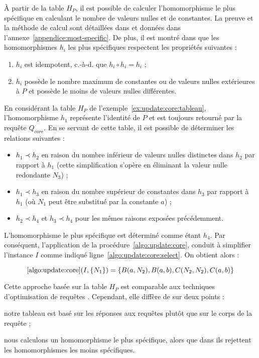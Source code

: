 À partir de la table $H_P$, il est possible de calculer l'homomorphisme le plus spécifique en calculant le nombre de valeurs nulles et de constantes.
La preuve et la méthode de calcul sont détaillées dans \cite{chabinIncrementalConsistentUpdating2023} et données dans l'annexe~\ref{appendice:most-specific}.
De plus, il est montré dans \cite{chabinIncrementalConsistentUpdating2023} que les homomorphismes $h_i$ les plus spécifiques respectent les propriétés suivantes :

\begin{enumerate}
	\item $h_i$ est idempotent, c.-à-d. que $h_i \circ h_i = h_i$ ;
	\item $h_i$ possède le nombre maximum de constantes ou de valeurs nulles extérieures à $P$ et possède le moins de valeurs nulles différentes.
\end{enumerate}

\begin{example}
	En considérant la table $H_P$ de l'exemple~\ref{ex:update:core:tableau}, l'homomorphisme $h_1$ représente l'identité de $P$ et est toujours retourné par la requête $Q_{core}$.
	En se servant de cette table, il est possible de déterminer les relations suivantes :

	\begin{itemize}
		\item $h_1 \prec h_2$ en raison du nombre inférieur de valeurs nulles distinctes dans $h_2$ par rapport à $h_1$ (cette simplification s'opère en éliminant la valeur nulle redondante $N_3$) ;
		\item $h_1 \prec h_3$ en raison du nombre supérieur de constantes dans $h_3$ par rapport à $h_1$ (où $N_1$ peut être substitué par la constante $a$) ;
		\item $h_2 \prec h_4$ et $h_3 \prec h_4$ pour les mêmes raisons exposées précédemment.
	\end{itemize}

	L'homomorphisme le plus spécifique est déterminé comme étant $h_4$.
	Par conséquent, l'application de la procédure~\ref{algo:update:core}, conduit à simplifier l'instance $I$ comme indiqué ligne~\ref{algo:update:core:select}. On obtient alors :

	\[
		\ref{algo:update:core}(I, \{N_1\}) = \{B(a, N_2), B(a, b), C(N_2, N_2), C(a, b)\}
	\]
\end{example}

Cette approche basée sur la table $H_P $ est comparable aux techniques d'optimisation de requêtes \cite{chandraOptimalImplementationConjunctive1977}.
Cependant, elle diffère de \cite{ahoEfficientOptimizationClass1979,chandraOptimalImplementationConjunctive1977} sur deux points :
\begin{enumerate*}[label=(\roman*)]
	\item notre tableau est basé sur les réponses aux requêtes plutôt que sur le corps de la requête ;
	\item nous calculons un homomorphisme le plus spécifique, alors que dans \cite{ahoEfficientOptimizationClass1979} ils rejettent les homomorphismes les moins spécifiques.
\end{enumerate*}
